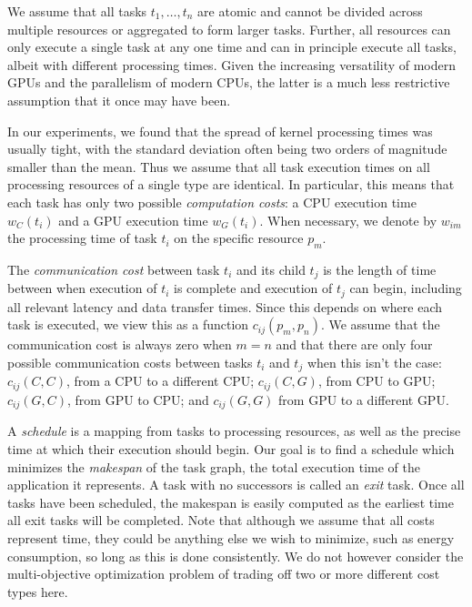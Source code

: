 \documentclass[runningheads]{llncs}
\begin{document}
We assume that all tasks $t_1, \dots, t_n$ are atomic and cannot be divided across multiple resources or aggregated to form larger tasks. Further, all resources can only execute a single task at any one time and can in principle execute all tasks, albeit with different processing times. Given the increasing versatility of modern GPUs and the parallelism of modern CPUs, the latter is a much less restrictive assumption that it once may have been. 

In our experiments, we found that the spread of kernel processing times was usually tight, with the standard deviation often being two orders of magnitude smaller than the mean. Thus we assume that all task execution times on all processing resources of a single type are identical. In particular, this means that each task has only two possible {\em computation costs}: a CPU execution time $w_C(t_i)$ and a GPU execution time $w_G(t_i)$. When necessary, we denote by $w_{im}$ the processing time of task $t_i$ on the specific resource $p_m$.

The {\em communication cost} between task $t_i$ and its child $t_j$ is the length of time between when execution of $t_i$ is complete and execution of $t_j$ can begin, including all relevant latency and data transfer times. Since this depends on where each task is executed, we view this as a function $c_{ij}(p_m, p_n)$. We assume that the communication cost is always zero when $m = n$ and that there are only four possible communication costs between tasks $t_i$ and $t_j$ when this isn't the case: $c_{ij}(C, C)$, from a CPU to a different CPU; $c_{ij}(C, G)$, from CPU to GPU; $c_{ij}(G, C)$, from GPU to CPU; and $c_{ij}(G, G)$ from GPU to a different GPU.  

A {\em schedule} is a mapping from tasks to processing resources, as well as the precise time at which their execution should begin. Our goal is to find a schedule which minimizes the {\em makespan} of the task graph, the total execution time of the application it represents. A task with no successors is called an {\em exit} task. Once all tasks have been scheduled, the makespan is easily computed as the earliest time all exit tasks will be completed. Note that although we assume that all costs represent time, they could be anything else we wish to minimize, such as energy consumption, so long as this is done consistently. We do not however consider the multi-objective optimization problem of trading off two or more different cost types here. 
\end{document}
